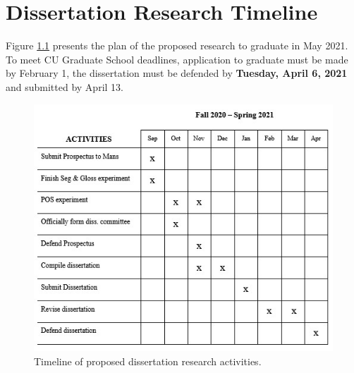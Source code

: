 \chapter{Dissertation Research Timeline}
\label{chap:timeline}

Figure \ref{fig:timeline} presents the plan of the proposed research to graduate in May 2021. To meet CU Graduate School deadlines, application to graduate must be made by February 1, the dissertation must be defended by \textbf{Tuesday, April 6, 2021} and submitted by April 13.


\begin{figure}[H]
    \centering
    \includegraphics[width=14cm]{figs/TimelineUpdated.jpg}
    \caption[Timeline]{Timeline of proposed dissertation research activities.}
    \label{fig:timeline}
\end{figure}
